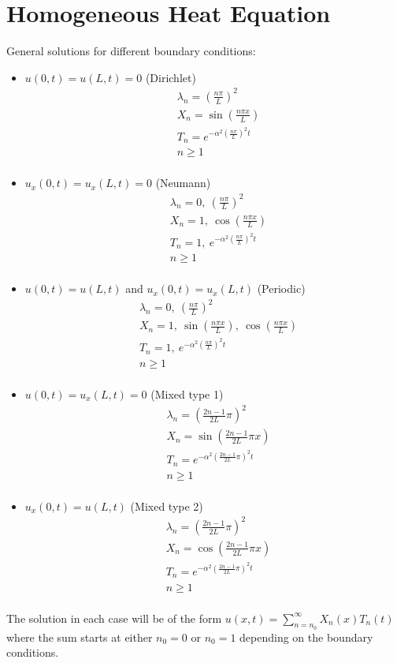 \documentclass[11pt, fleqn]{article}
\newcommand{\<}{\langle}
\renewcommand{\>}{\rangle}
\newcommand{\brround}[1]{\left( #1 \right)}
\begin{document}
\section*{Homogeneous Heat Equation}
General solutions for different boundary conditions:
\begin{itemize}
    \item $u(0,t)=u(L,t)=0$ (Dirichlet)
    \begin{align*}
        &\lambda_n=\brround{\frac{n\pi}{L}}^2\\
        &X_n=\sin\brround{\frac{n\pi x}{L}}\\
        &T_n=e^{-\alpha^2\brround{\frac{n\pi}{L}}^2t}\\
        &n\geq1\\
    \end{align*}
    \item $u_x(0,t)=u_x(L,t)=0$ (Neumann)
    \begin{align*}
        &\lambda_n=0,\ \brround{\frac{n\pi}{L}}^2\\
        &X_n=1,\ \cos\brround{\frac{n\pi x}{L}}\\
        &T_n=1,\ e^{-\alpha^2\brround{\frac{n\pi}{L}}^2t}\\
        &n\geq1\\
    \end{align*}
    \item $u(0,t)=u(L,t)$ and $u_x(0,t)=u_x(L,t)$ (Periodic)
    \begin{align*}
        &\lambda_n=0,\ \brround{\frac{n\pi}{L}}^2\\
        &X_n=1,\ \sin\brround{\frac{n\pi x}{L}},\ \cos\brround{\frac{n\pi x}{L}}\\
        &T_n=1,\ e^{-\alpha^2\brround{\frac{n\pi}{L}}^2t}\\
        &n\geq1\\
    \end{align*}
    \item $u(0,t)=u_x(L,t)=0$ (Mixed type 1)
    \begin{align*}
        &\lambda_n=\brround{\frac{2n-1}{2L}\pi}^2\\
        &X_n=\sin\brround{\frac{2n-1}{2L}\pi x}\\
        &T_n=e^{-\alpha^2\brround{\frac{2n-1}{2L}\pi}^2t}\\
        &n\geq1\\
    \end{align*}
    \item $u_x(0,t)=u(L,t)$ (Mixed type 2)
    \begin{align*}
        &\lambda_n=\brround{\frac{2n-1}{2L}\pi}^2\\
        &X_n=\cos\brround{\frac{2n-1}{2L}\pi x}\\
        &T_n=e^{-\alpha^2\brround{\frac{2n-1}{2L}\pi}^2t}\\
        &n\geq1\\
    \end{align*}
\end{itemize}
The solution in each case will be of the form $u(x,t)=\sum\limits_{n=n_0}^\infty X_n(x)T_n(t)$ where the sum starts at either $n_0=0$ or $n_0=1$ depending on the boundary conditions.
\end{document}
